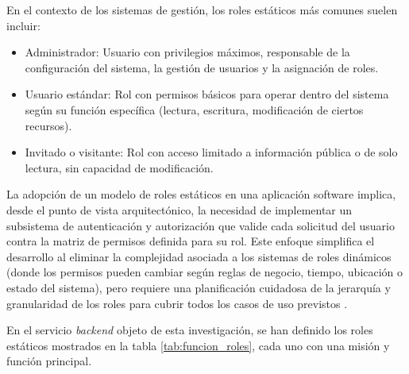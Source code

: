 En el contexto de los sistemas de gestión, los roles estáticos más comunes suelen incluir:

\begin{itemize}
    \item Administrador: Usuario con privilegios máximos, responsable de la configuración del sistema, la gestión de usuarios y la asignación de roles.
    \item Usuario estándar: Rol con permisos básicos para operar dentro del sistema según su función específica (lectura, escritura, modificación de ciertos recursos).
    \item Invitado o visitante: Rol con acceso limitado a información pública o de solo lectura, sin capacidad de modificación.
\end{itemize}

La adopción de un modelo de roles estáticos en una aplicación software implica, desde el punto de vista arquitectónico, la necesidad de implementar un subsistema de autenticación y 
autorización que valide cada solicitud del usuario contra la matriz de permisos definida para su rol. 
Este enfoque simplifica el desarrollo al eliminar la complejidad asociada a los sistemas de roles dinámicos 
(donde los permisos pueden cambiar según reglas de negocio, tiempo, ubicación o estado del sistema), 
pero requiere una planificación cuidadosa de la jerarquía y granularidad de los roles para cubrir todos 
los casos de uso previstos \citep{colantonio2010role}.

En el servicio \textit{backend} objeto de esta investigación, se han definido los roles estáticos mostrados en la tabla \ref{tab:funcion_roles}, 
cada uno con una misión y función principal.

